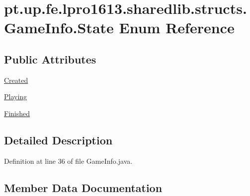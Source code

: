 \hypertarget{enumpt_1_1up_1_1fe_1_1lpro1613_1_1sharedlib_1_1structs_1_1_game_info_1_1_state}{}\section{pt.\+up.\+fe.\+lpro1613.\+sharedlib.\+structs.\+Game\+Info.\+State Enum Reference}
\label{enumpt_1_1up_1_1fe_1_1lpro1613_1_1sharedlib_1_1structs_1_1_game_info_1_1_state}
\subsection*{Public Attributes}
\begin{DoxyCompactItemize}
\item 
\hyperlink{enumpt_1_1up_1_1fe_1_1lpro1613_1_1sharedlib_1_1structs_1_1_game_info_1_1_state_a08d086bc4e26d37aec3de2c6992bd39b}{Created}
\item 
\hyperlink{enumpt_1_1up_1_1fe_1_1lpro1613_1_1sharedlib_1_1structs_1_1_game_info_1_1_state_a79e6ff19f3baa477e21195e12cadcebc}{Playing}
\item 
\hyperlink{enumpt_1_1up_1_1fe_1_1lpro1613_1_1sharedlib_1_1structs_1_1_game_info_1_1_state_ad04e28672f6f393a5b8705ef43d76af9}{Finished}
\end{DoxyCompactItemize}


\subsection{Detailed Description}


Definition at line 36 of file Game\+Info.\+java.



\subsection{Member Data Documentation}
\hypertarget{enumpt_1_1up_1_1fe_1_1lpro1613_1_1sharedlib_1_1structs_1_1_game_info_1_1_state_a08d086bc4e26d37aec3de2c6992bd39b}{}\label{enumpt_1_1up_1_1fe_1_1lpro1613_1_1sharedlib_1_1structs_1_1_game_info_1_1_state_a08d086bc4e26d37aec3de2c6992bd39b} 
